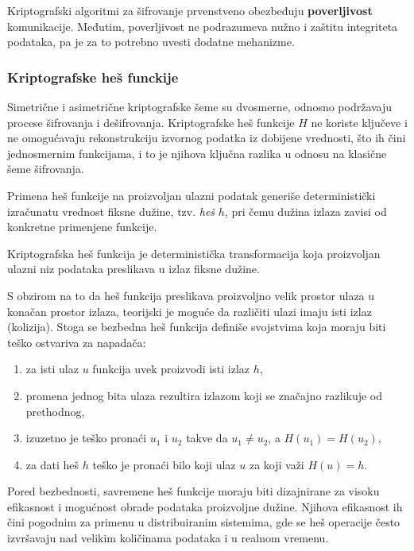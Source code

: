 Kriptografski algoritmi za šifrovanje prvenstveno obezbeđuju \textbf{poverljivost} komunikacije. Međutim, poverljivost ne podrazumeva nužno i zaštitu integriteta podataka, pa je za to potrebno uvesti dodatne mehanizme.

\subsubsection{Kriptografske heš funckije}
Simetrične i asimetrične kriptografske šeme su dvosmerne, odnosno podržavaju procese šifrovanja i dešifrovanja. Kriptografske heš funkcije $H$ ne koriste ključeve i ne omogućavaju rekonstrukciju izvornog podatka iz dobijene vrednosti, što ih čini jednosmernim funkcijama, i to je njihova ključna razlika u odnosu na klasične šeme šifrovanja.

Primena heš funkcije na proizvoljan ulazni podatak generiše deterministički izračunatu vrednost fiksne dužine, tzv. \textit{heš} $h$, pri čemu dužina izlaza zavisi od konkretne primenjene funkcije.

\begin{definicija}
Kriptografska heš funkcija je deterministička transformacija koja proizvoljan ulazni niz podataka preslikava u izlaz fiksne dužine.
\end{definicija}

S obzirom na to da heš funkcija preslikava proizvoljno velik prostor ulaza u konačan prostor izlaza, teorijski je moguće da različiti ulazi imaju isti izlaz (kolizija). Stoga se bezbedna heš funkcija definiše svojstvima koja moraju biti teško ostvariva za napadača:
\begin{enumerate}
\item za isti ulaz $u$ funkcija uvek proizvodi isti izlaz $h$,
\item promena jednog bita ulaza rezultira izlazom koji se značajno razlikuje od prethodnog,
\item izuzetno je teško pronaći $u_1$ i $u_2$ takve da $u_1 \neq u_2$, a $H(u_1)=H(u_2)$,
\item za dati heš $h$ teško je pronaći bilo koji ulaz $u$ za koji važi $H(u)=h$.
\end{enumerate}

Pored bezbednosti, savremene heš funkcije moraju biti dizajnirane za visoku efikasnost i mogućnost obrade podataka proizvoljne dužine. Njihova efikasnost ih čini pogodnim za primenu u distribuiranim sistemima, gde se heš operacije često izvršavaju nad velikim količinama podataka i u realnom vremenu.

